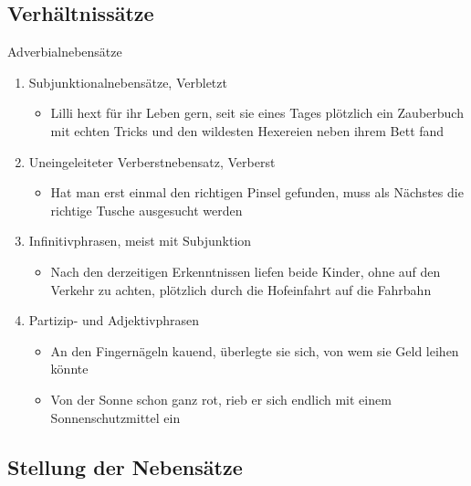 \documentclass[UTF8]{report}
\begin{document}
\subsection{Verhältnissätze}
Adverbialnebensätze
\begin{enumerate}
    \item Subjunktionalnebensätze, Verbletzt
    \begin{itemize}
        \item Lilli hext für ihr Leben gern, seit sie eines Tages plötzlich ein Zauberbuch mit echten
        Tricks und den wildesten Hexereien neben ihrem Bett fand
    \end{itemize}
    \item Uneingeleiteter Verberstnebensatz, Verberst
    \begin{itemize}
        \item Hat man erst einmal den richtigen Pinsel gefunden, muss als Nächstes
        die richtige Tusche ausgesucht werden
    \end{itemize}
    \item Infinitivphrasen, meist mit Subjunktion
    \begin{itemize}
        \item Nach den derzeitigen Erkenntnissen liefen beide Kinder, 
        ohne auf den Verkehr zu achten, plötzlich durch die Hofeinfahrt auf die Fahrbahn
    \end{itemize}
    \item Partizip- und Adjektivphrasen
    \begin{itemize}
        \item An den Fingernägeln kauend, überlegte sie sich, von wem sie Geld leihen könnte
        \item Von der Sonne schon ganz rot, rieb er sich endlich mit einem Sonnenschutzmittel ein
    \end{itemize}
\end{enumerate}

\subsection{Stellung der Nebensätze }
\end{document}
